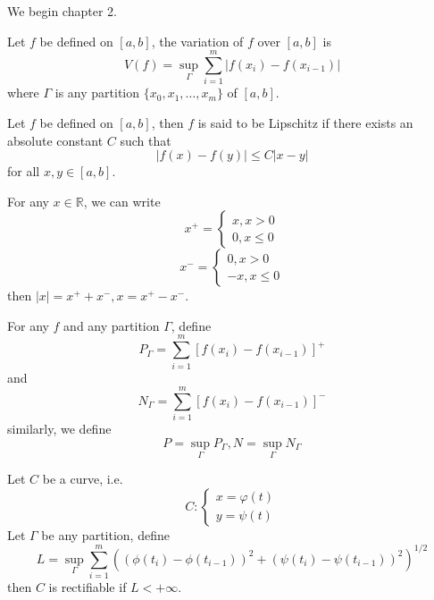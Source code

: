 \documentclass[openany]{book}
\newcommand{\R}{\mathbb{R}}
\begin{document}
We begin chapter 2.
\begin{defn}[variation]
    Let $f$ be defined on $[a,b]$, the variation of $f$ over $[a,b]$ is 
    \begin{equation*}
        V(f)=\sup_\Gamma\sum_{i=1}^m|f(x_i)-f(x_{i-1})|
    \end{equation*}
    where $\Gamma$ is any partition $\{x_0,x_1,\dots, x_m\}$ of $[a,b]$.
\end{defn}
\begin{defn}[Lipschitz]
    Let $f$ be defined on $[a,b]$, then $f$ is said to be Lipschitz if there exists an absolute constant $C$ such that 
    \begin{equation*}
        |f(x)-f(y)|\leq C|x-y|
    \end{equation*}
    for all $x,y\in [a,b]$.
\end{defn}
\begin{defn}[splitting]
    For any $x\in\R$, we can write 
    \begin{equation*}
        x^+=\begin{cases}
            x, x>0\\
            0, x\leq 0
        \end{cases}
    \end{equation*}
    \begin{equation*}
        x^-=\begin{cases}
            0, x>0\\
            -x, x\leq 0
        \end{cases}
    \end{equation*}
    then $|x|=x^{+}+x^{-}, x=x^{+}-x^{-}$.
\end{defn}
\begin{defn}
    For any $f$ and any partition $\Gamma$, define 
    \begin{equation*}
        P_\Gamma=\sum_{i=1}^m[f(x_i)-f(x_{i-1})]^+
    \end{equation*}
    and 
    \begin{equation*}
        N_\Gamma=\sum_{i=1}^m[f(x_i)-f(x_{i-1})]^-
    \end{equation*}
    similarly, we define 
    \begin{equation*}
        P=\sup_\Gamma P_\Gamma, N=\sup_\Gamma N_\Gamma
    \end{equation*}
\end{defn}
\begin{defn}
    Let $C$ be a curve, i.e. 
    \begin{equation*}
        C:\begin{cases}
            x=\varphi(t)\\
            y=\psi(t)
        \end{cases}
    \end{equation*}
    Let $\Gamma$ be any partition, define 
    \begin{equation*}
        L=\sup_\Gamma\sum_{i=1}^m\left((\phi(t_i)-\phi(t_{i-1}))^2+(\psi(t_i)-\psi(t_{i-1}))^2\right)^{1/2}
    \end{equation*}
    then $C$ is rectifiable if $L<+\infty$.
\end{defn}
\end{document}
